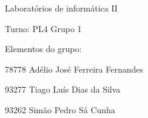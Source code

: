 
\begin{DoxyItemize}
\item Laboratórios de informática II
\end{DoxyItemize}

Turno\+: P\+L4 Grupo 1

Elementos do grupo\+:
\begin{DoxyItemize}
\item 78778 Adélio José Ferreira Fernandes
\item 93277 Tiago Luís Dias da Silva
\item 93262 Simão Pedro Sá Cunha 
\end{DoxyItemize}